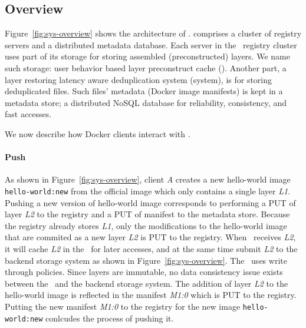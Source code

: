 \vspace{-4pt}
\subsection{Overview}
\label{sec:design}
\vspace{-4pt}



Figure~\ref{fig:sys-overview} shows the architecture of \sysname.
 \sysname comprises a cluster of registry servers and a distributed metadata database. 
Each server in the \sysname~registry cluster uses part of its storage for storing assembled (\ie preconstructed) layers. 
We name such storage: user behavior based layer preconstruct cache (\preconstructcachename).
Another part, a layer restoring latency aware deduplication system (\dedupname system), is for storing deduplicated files. 
Such files' metadata (\eg Docker image manifests) is kept in a metadata store; a distributed NoSQL database for 
reliability, consistency, and fast accesses.

We now describe how Docker clients interact with \sysname.

\paragraph{Push}
As shown in Figure~\ref{fig:sys-overview}, 
client \textit{A} creates a new hello-world image
\texttt{hello-world:new}
from the official image which only contains a single layer \textit{L1}. 
Pushing a new version of hello-world image corresponds to performing a PUT of layer \textit{L2} to the registry and a PUT of manifest to the metadata store. 
Because the registry already stores \textit{L1}, only the modifications to the hello-world image that are commited as a new layer \textit{L2} is PUT to the registry.
When \sysname~receives \textit{L2}, 
it will cache \textit{L2} in the \preconstructcachename~for later accesses,
and at the same time submit \textit{L2} to the backend storage system as shown in Figure~\ref{fig:sys-overview}.
The \preconstructcachename~uses write through policies. 
Since layers are immutable, no data consistency issue exists between the \preconstructcachename~and the backend storage system.
The addition of layer \textit{L2} to the hello-world image is reflected in the manifest \textit{M1:0} which is PUT to the registry.
Putting the new manifest \textit{M1:0} to the registry for the new image \texttt{hello-world:new} conlcudes the process of pushing it.



